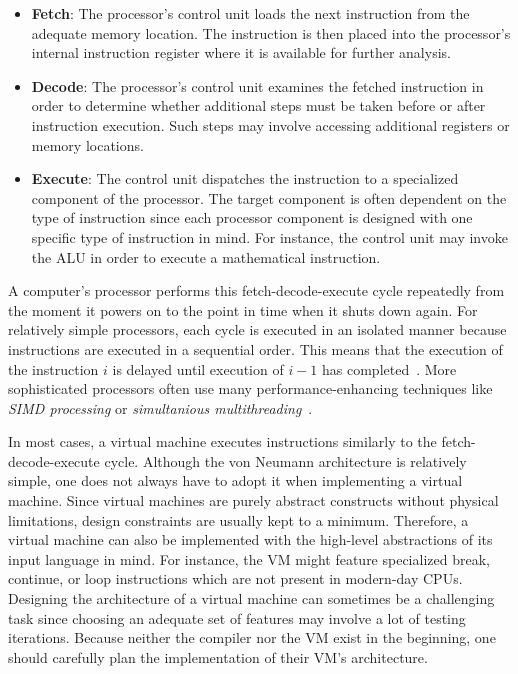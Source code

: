 \begin{itemize}
	\item \textbf{Fetch}: The processor's control unit loads the next instruction from the adequate memory location.
	      The instruction is then placed into the processor's internal instruction register where it is available for further analysis.
	\item \textbf{Decode}:
	      The processor's control unit examines the fetched instruction in order to determine whether additional steps must be taken before or after instruction execution.
	      Such steps may involve accessing additional registers or memory locations.
	\item \textbf{Execute}:
	      The control unit dispatches the instruction to a specialized component of the processor.
	      The target component is often dependent on the type of instruction since each processor component is designed with one specific type of instruction in mind.
	      For instance, the control unit may invoke the ALU in order to execute a mathematical instruction.
\end{itemize}

A computer's processor performs this fetch-decode-execute cycle repeatedly from the moment it powers on to the point in time when it shuts down again.
For relatively simple processors, each cycle is executed in an isolated manner because instructions are executed in a sequential order.
This means that the execution of the instruction $i$ is delayed until execution of $i - 1$ has completed~\cite[pp.~208-209]{Ledin2020-yp}.
More sophisticated processors often use many performance-enhancing techniques like \emph{SIMD processing} or \emph{simultanious multithreading}~\cite[pp.~217f.]{Ledin2020-yp}.

In most cases, a virtual machine executes instructions similarly to the fetch-decode-execute cycle.
Although the von Neumann architecture is relatively simple, one does not always have to adopt it when implementing a virtual machine.
Since virtual machines are purely abstract constructs without physical limitations, design constraints are usually kept to a minimum.
Therefore, a virtual machine can also be implemented with the high-level abstractions of its input language in mind.
For instance, the VM might feature specialized break, continue, or loop instructions which are not present in modern-day CPUs.
Designing the architecture of a virtual machine can sometimes be a challenging task since choosing an adequate set of features may involve a lot of testing iterations.
Because neither the compiler nor the VM exist in the beginning, one should carefully plan the implementation of their VM's architecture.

